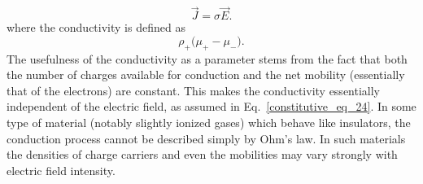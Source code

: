\documentclass[12pt,a4paper,oneside]{book}
\begin{document}
\begin{onehalfspace}
\begin{equation}\label{constitutive_eq_31}
	\vec{J}=\sigma\vec{E}.
\end{equation}
where the conductivity is defined as 
\begin{equation}\label{constitutive_eq_32}
	\rho_{+}\big(\mu_{+}-\mu_{-}\big).
\end{equation}
The usefulness of the conductivity as a parameter stems from the fact that both the number of charges available for conduction and the net mobility (essentially that of the electrons) are constant. This makes the conductivity essentially independent of the electric field, as assumed in Eq.~\eqref{constitutive_eq_24}. In some type of material (notably slightly ionized gases) which behave like insulators, the conduction process cannot be described simply by Ohm's law. In such materials the densities of charge carriers and even the mobilities may vary strongly with electric field intensity.


\end{onehalfspace}
\end{document}
